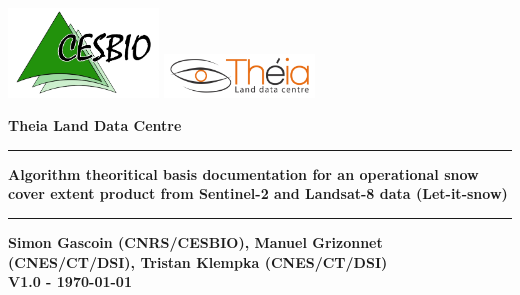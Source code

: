 \begin{titlepage}
\includegraphics[width=0.3\textwidth]{./images/logo_cesbio.png}
\hspace{5cm}
\includegraphics[width=0.3\textwidth]{./images/Theia_en.png}

\vspace{3cm}



\textcolor{PineGreen}{ \huge \bfseries Theia Land Data Centre\\ }
\rule{\linewidth}{0.5mm}
\begin{center}
{ \huge \bfseries Algorithm theoritical basis documentation for an operational snow cover extent product from Sentinel-2 and Landsat-8 data (Let-it-snow)\\}
\rule{\linewidth}{0.5mm}
{ \large \bfseries Simon Gascoin (CNRS/CESBIO), Manuel Grizonnet (CNES/CT/DSI), Tristan Klempka (CNES/CT/DSI)\\ }
{ \large \bfseries V1.0 - \today \\ }



\end{center}
\end{titlepage}
